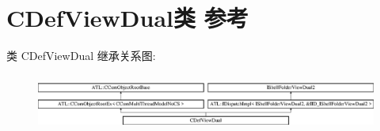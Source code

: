 \hypertarget{class_c_def_view_dual}{}\section{C\+Def\+View\+Dual类 参考}
\label{class_c_def_view_dual}
类 C\+Def\+View\+Dual 继承关系图\+:\begin{figure}[H]
\begin{center}
\leavevmode
\includegraphics[height=1.887640cm]{class_c_def_view_dual}
\end{center}
\end{figure}
